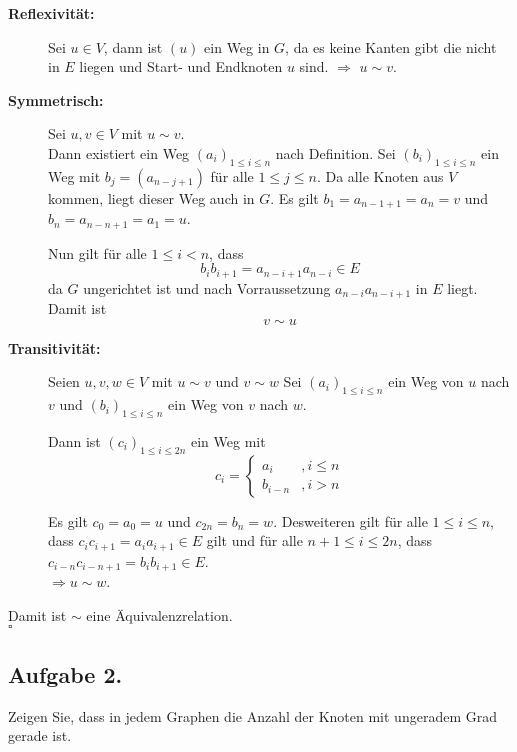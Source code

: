 \documentclass[11pt,a4paper,ngerman]{article}
\begin{document}
\begin{description}
	\item[\bfseries Reflexivität:]
		Sei $u \in V$, dann ist $(u)$  ein Weg in $G$, da es keine Kanten gibt die nicht in $E$ liegen und Start- und Endknoten
		$u$ sind. $\Rightarrow$ $u \sim v$.

	\item[\bfseries Symmetrisch:]
		Sei $u,v \in V$ mit $u \sim v$.\\

		Dann existiert ein Weg $(a_i)_{1 \leq i \leq n}$ nach Definition.
		Sei $(b_i)_{1 \leq i \leq n}$ ein Weg mit $b_j = (a_{n-j+1})$ für alle $1 \leq j \leq n$. 
		Da alle Knoten aus $V$ kommen, liegt dieser Weg auch in $G$.
		Es gilt $b_1 = a_{n-1+1} = a_n = v$ und $b_n = a_{n - n + 1} = a_1 = u$.

		Nun gilt für alle $1 \leq i < n$, dass
		$$
			b_ib_{i+1} = a_{n-i+1}a_{n-i} \in E
		$$
		da $G$ ungerichtet ist und nach Vorraussetzung $a_{n-i}a_{n-i+1}$ in $E$ liegt.
		Damit ist
		$$
			v \sim u
		$$
	\item[\bfseries Transitivität:]
		Seien $u,v,w \in V$ mit $u \sim v$ und $v \sim w$
		Sei $(a_i)_{1 \leq i \leq n}$ ein Weg von $u$ nach $v$ und
		$(b_i)_{1\leq i \leq n}$ ein Weg von $v$ nach $w$.

		Dann ist 
		$(c_i)_{1 \leq i \leq 2n}$ ein Weg mit
		$$
			c_i = \left\{ \begin{array}{lr} a_i &, i \leq n \\ b_{i-n} &, i > n \end{array}\right.
		$$
		
		Es gilt $c_0 = a_0 = u$ und $c_{2n} = b_n = w$.
		Desweiteren gilt für alle $1 \leq i \leq n$, dass $c_ic_{i+1} = a_ia_{i+1}\in E$ gilt
		und für alle $n+1 \leq i \leq 2n$, dass $c_{i-n}c_{i-n+1}=b_ib_{i+1} \in E$.\\

		$\Rightarrow u \sim w$.
\end{description}

Damit ist $\sim$ eine Äquivalenzrelation.\\
\mbox{}\hfill$\square$

\subsection*{Aufgabe 2.}

Zeigen Sie, dass in jedem Graphen die Anzahl der Knoten mit ungeradem Grad gerade ist.\\
\end{document}

